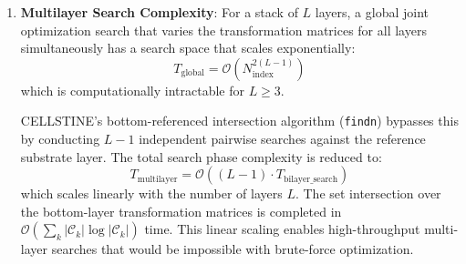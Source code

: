 \documentclass[9pt,a4paper,twoside]{tau-class/tau}
\begin{document}
\begin{enumerate}[label=\arabic*.]
    To illustrate the practical speedup, consider a typical search with $N_{\text{index}} = 12$ and $N_{\theta} = 300$ angles. The size of the grid vector sets is $M_1 \approx M_2 \approx 1100$. A naive search evaluates $300 \times (1100)^2 \approx 3.6 \times 10^8$ vector pairs. In CELLSTINE, the precomputation performs $(1100)^2 \approx 1.2 \times 10^6$ scalar length mismatch checks. With a relative strain threshold $\epsilon = 0.002$, the candidate pair set contains only $N_{\text{cand}} \approx 1200$ pairs. Inside the twist angle loop, only these 1200 pairs are rotated and checked, requiring $300 \times 1200 \approx 3.6 \times 10^5$ evaluations. The total operations are reduced by a factor of over $150\times$, converting multi-minute searches into near-instantaneous runs.
    
    Compared to CellMatch \cite{cellmatch}, which is written in compiled C but relies on the naive all-pairs search, CELLSTINE's precomputation filter allows its Python implementation to run faster or at comparable speed. Compared to MLM \cite{mlm}, which uses a continuous solve-and-round method to bypass the grid search, CELLSTINE provides comparable speed for typical systems while guaranteeing the exact global minimum strain configuration, avoiding MLM's continuous rounding approximations that can fail for low-symmetry cells.
    
    \item \textbf{Multilayer Search Complexity}: For a stack of $L$ layers, a global joint optimization search that varies the transformation matrices for all layers simultaneously has a search space that scales exponentially:
    \begin{equation}
        T_{\text{global}} = \mathcal{O}(N_{\text{index}}^{2(L-1)})
    \end{equation}
    which is computationally intractable for $L \ge 3$.
    
    CELLSTINE's bottom-referenced intersection algorithm (\texttt{findn}) bypasses this by conducting $L-1$ independent pairwise searches against the reference substrate layer. The total search phase complexity is reduced to:
    \begin{equation}
        T_{\text{multilayer}} = \mathcal{O}\left( (L - 1) \cdot T_{\text{bilayer\_search}} \right)
    \end{equation}
    which scales linearly with the number of layers $L$. The set intersection over the bottom-layer transformation matrices is completed in $\mathcal{O}(\sum_k |\mathcal{C}_k| \log |\mathcal{C}_k|)$ time. This linear scaling enables high-throughput multi-layer searches that would be impossible with brute-force optimization.
\end{enumerate}
\end{document}
